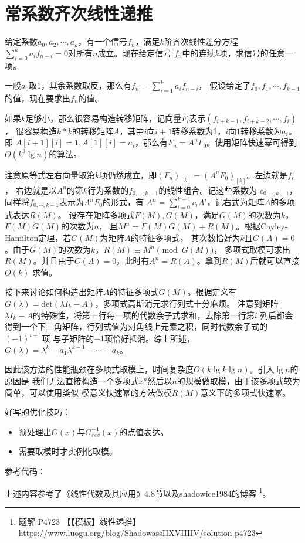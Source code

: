 \section{常系数齐次线性递推}
给定系数$a_0,a_2,\cdots,a_k$，有一个信号${f_n}$，满足$k$阶齐次线性差分方程
$\displaystyle \sum_{i=0}^k{a_if_{n-i}}=0$对所有$n$成立。现在给定信号
${f_n}$中的连续$k$项，求信号的任意一项。

一般$a_0$取1，其余系数取反，那么有$\displaystyle f_n=\sum_{i=1}^k{a_if_{n-i}}$，
假设给定了$f_0,f_1,\cdots,f_{k-1}$的值，现在要求出$f_n$的值。

如果$k$足够小，那么很容易构造转移矩阵，记向量$F_i$表示$(f_{i+k-1},f_{i+k-2},\cdots,f_i)$，
很容易构造$k*k$的转移矩阵$A$，其中$i$向$i+1$转移系数为1，$i$向$1$转移系数为$a_i$。即
$A[i+1][i]=1,A[1][i]=a_i$，那么有$F_n=A^nF_0$。使用矩阵快速幂可得到
$O(k^3\lg n)$的算法。

注意原等式左右向量取第$k$项仍然成立，即$(F_n)_{[k]}=(A^nF_0)_{[k]}$。左边就是$f_n$，
右边就是以$A^n$的第$k$行为系数的$f_{0,\cdots,k-1}$的线性组合。记这些系数为
$c_{0,\cdots,k-1}$，同样将$f_{0,\cdots,k-1}$表示为$A^nF_0$的形式，有
$A^n=\displaystyle \sum_{i=0}^{k-1}{c_iA^i}$，记右式为矩阵$A$的多项式表达$R(M)$。
设存在矩阵多项式$F(M),G(M)$，满足$G(M)$的次数为$k$，$F(M)G(M)$的次数为$n$，
且$M^n=F(M)G(M)+R(M)$。根据Cayley-Hamilton定理，若$G(M)$为矩阵$A$的特征多项式，
其次数恰好为$k$且$G(A)=0$。由于$G(M)$的次数为$k$，$R(M)\equiv M^n\pmod{G(M)}$，
多项式取模可求出$R(M)$。并且由于$G(A)=0$，此时有$A^n=R(A)$。拿到$R(M)$后就可以直接$O(k)$
求值。

接下来讨论如何构造出矩阵$A$的特征多项式$G(M)$。根据定义有
$G(\lambda)=\textrm{det}(\lambda I_k-A)$，多项式高斯消元求行列式十分麻烦。
注意到矩阵$\lambda I_k-A$的特殊性，将第一行每一项的代数余子式求和，去除第一行第$i$
列后都会得到一个下三角矩阵，行列式值为对角线上元素之积，同时代数余子式的$(-1)^{i+1}$项
与子矩阵的$-1$项恰好抵消。综上所述，$G(\lambda)=\lambda^k-a_1\lambda^{k-1}-\cdots-a_k$。

因此该方法的性能瓶颈在多项式取模上，时间复杂度$O(k\lg k\lg n)$。引入$\lg n$的原因是
我们无法直接构造一个多项式$x^n$然后以$n$的规模做取模，由于该多项式较为简单，可以使用类似
模意义快速幂的方法做模$R(M)$意义下的多项式快速幂。

好写的优化技巧：
\begin{itemize}
    \item 预处理出$G(x)$与$G_{rev}^{-1}(x)$的点值表达。
    \item 需要取模时才实例化取模。
\end{itemize}

参考代码：


上述内容参考了《线性代数及其应用》\cite{LAIA5}4.8节以及shadowice1984的博客
\footnote{
    题解 P4723 【【模板】线性递推】
    \url{https://www.luogu.org/blog/ShadowassIIXVIIIIV/solution-p4723}
}。
